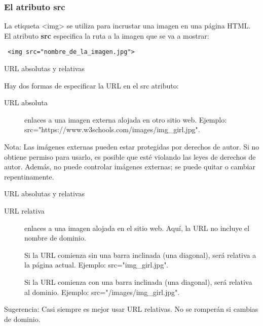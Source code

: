 \begin{frame}[fragile]
  \frametitle{El atributo src}

  La etiqueta <img> se utiliza para incrustar una imagen en una
  página HTML. El atributo \textbf{src} especifica la ruta a la
  imagen que se va a mostrar:

  \vspace{\baselineskip}
  \begin{lstlisting}
 <img src="nombre_de_la_imagen.jpg">
  \end{lstlisting}
\end{frame}

\begin{frame}[c]{URL absolutas y relativas}

  Hay dos formas de especificar la URL en el src atributo:

  \vspace{\baselineskip}
  \begin{description}
    \item[URL absoluta] enlaces a una imagen externa alojada en
      otro sitio web. Ejemplo:
      src="https://www.w3schools.com/images/img\_girl.jpg".
  \end{description}

  \begin{alertblock}{Nota:}
    Las imágenes externas pueden estar protegidas por derechos de autor.
    Si no obtiene permiso para usarlo, es posible que esté violando las
    leyes de derechos de autor. Además, no puede controlar imágenes
    externas; se puede quitar o cambiar repentinamente.
  \end{alertblock}
\end{frame}

\begin{frame}[c]{URL absolutas y relativas}

  \begin{description}
    \item[URL relativa] enlaces a una imagen alojada en el sitio web.
      Aquí, la URL no incluye el nombre de dominio.

      \vspace{\baselineskip}
      Si la URL comienza sin una barra inclinada (una diagonal),
      será relativa a la página actual.
      Ejemplo: src="img\_girl.jpg".

      \vspace{\baselineskip}
      Si la URL comienza con una barra
      inclinada (una diagonal), será relativa al dominio.
      Ejemplo: src="/images/img\_girl.jpg".
  \end{description}

  \begin{exampleblock}{Sugerencia:}
    Casi siempre es mejor usar URL relativas.
    No se romperán si cambias de dominio.
  \end{exampleblock}
\end{frame}

